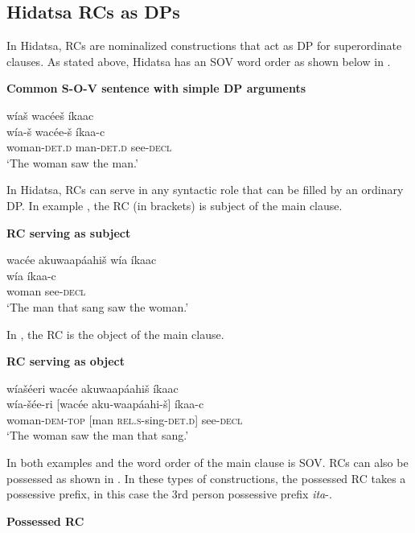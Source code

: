 \documentclass[output=paper]{LSP/langsci}
\begin{document}
\subsection{Hidatsa RCs as DPs} 

In Hidatsa, RCs are nominalized constructions that act as DP for superordinate clauses. As stated above, Hidatsa has an SOV word order as shown below in .

\ea \textbf{Common S-O-V sentence with simple DP arguments} \label{boyle1}

\glll w\'ia\v{s} wac\'ee\v{s} \'ikaac\\
w\'ia-\v{s}  wac\'ee-\v{s} \'ikaa-c\\
woman-\textsc{det.d} man-\textsc{det.d} see-\textsc{decl}\\
\trans`The woman saw the man.' 
\z

In Hidatsa, RCs can serve in any syntactic role that can be filled by an ordinary DP. In example , the RC (in brackets) is subject of the main clause.  

\ea \textbf{RC serving as subject} \label{boyle2}

\glll {\ob}wac\'ee akuwaap\'aahi\v{s}{\cb}  w\'ia \'ikaac\\	
[wac\'ee aku-waap\'aahi-\v{s}] w\'ia  \'ikaa-c\\
[man \textsc{rel.s}-sing-\textsc{det.d}] woman see-\textsc{decl}\\
\trans`The man that sang saw the woman.' 
\z

In , the RC is the object of the main clause.

\ea \textbf{RC serving as object} \label{boyle3}

\glll w\'ia\v{s}\'eeri  {\ob}wac\'ee akuwaap\'aahi\v{s}{\cb}  \'ikaac\\
w\'ia-\v{s}\'ee-ri  [wac\'ee aku-waap\'aahi-\v{s}] \'ikaa-c\\
woman-\textsc{dem-top} [man \textsc{rel.s}-sing-\textsc{det.d}] see-\textsc{decl}\\
\trans `The woman saw the man that sang.' 
\z

In both examples  and  the word order of the main clause is SOV. RCs can also be possessed as shown in . In these types of constructions, the possessed RC takes a possessive prefix, in this case the 3rd person possessive prefix \textit{ita}-.

\ea \textbf{Possessed RC} \label{boyle4}
\end{document}
